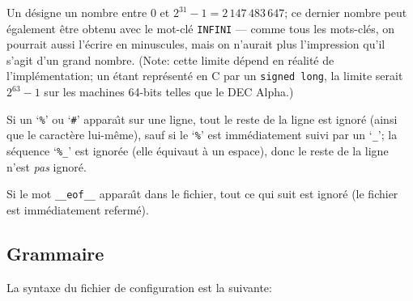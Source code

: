 \documentclass[10pt]{article}
\begin{document}
	Un  d\'esigne un nombre entre $0$ et $2^{31}-1 =
2\,147\,483\,647$; ce dernier nombre peut \'egalement \^etre obtenu
avec le mot-cl\'e \verb|INFINI| --- comme tous les mots-cl\'es, on
pourrait aussi l'\'ecrire en minuscules, mais on n'aurait plus
l'impression qu'il s'agit d'un grand nombre.  (Note: cette limite
d\'epend en r\'ealit\'e de l'impl\'ementation; un  \'etant
repr\'esent\'e en C par un \verb|signed long|, la limite serait
$2^{63}-1$ sur les machines 64-bits telles que le DEC Alpha.)

	Si un `\verb|%|' ou `\verb|#|' appara{\^\i}t sur une ligne, tout
le reste de la ligne est ignor\'e (ainsi que le caract\`ere lui-m\^eme),
sauf si le `\verb|%|' est imm\'ediatement suivi par un `\verb|_|'; la
s\'equence `\verb|%_|' est ignor\'ee (elle \'equivaut \`a un espace),
donc le reste de la ligne n'est {\em pas\/} ignor\'e.

	Si le mot \verb|__eof__| appara{\^\i}t dans le fichier, tout
ce qui suit est ignor\'e (le fichier est imm\'ediatement referm\'e).

\subsection{Grammaire}

La syntaxe du fichier de configuration est la suivante:

\medbreak

\end{document}
